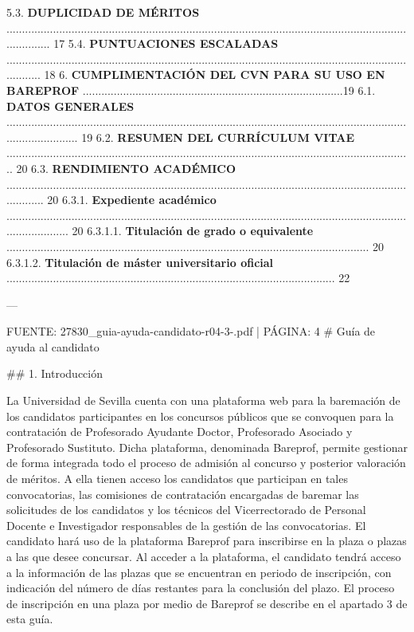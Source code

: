 \documentclass{article}
\begin{document}
\begin{itemize}
\begin{itemize}
\begin{scriptsize}
                  5.3. \textbf{DUPLICIDAD DE MÉRITOS} ............................................................................................................................................... 17
                  5.4. \textbf{PUNTUACIONES ESCALADAS} ............................................................................................................................................ 18
                  6. \textbf{CUMPLIMENTACIÓN DEL CVN PARA SU USO EN BAREPROF} ....................................................................................19
                  6.1. \textbf{DATOS GENERALES} ........................................................................................................................................................ 19
                  6.2. \textbf{RESUMEN DEL CURRÍCULUM VITAE} ................................................................................................................................... 20
                  6.3. \textbf{RENDIMIENTO ACADÉMICO} ............................................................................................................................................. 20
                  6.3.1. \textbf{Expediente académico} ..................................................................................................................................................... 20
                  6.3.1.1. \textbf{Titulación de grado o equivalente} ..................................................................................................................... 20
                  6.3.1.2. \textbf{Titulación de máster universitario oficial} .......................................................................................................... 22

                  ---

                  FUENTE: 27830\_guia-ayuda-candidato-r04-3-.pdf | PÁGINA: 4
                  \# Guía de ayuda al candidato

                  \#\# 1. Introducción

                  La Universidad de Sevilla cuenta con una plataforma web para la baremación de los candidatos participantes en los concursos públicos que se convoquen para la contratación de Profesorado Ayudante Doctor, Profesorado Asociado y Profesorado Sustituto. Dicha plataforma, denominada Bareprof, permite gestionar de forma integrada todo el proceso de admisión al concurso y posterior valoración de méritos. A ella tienen acceso los candidatos que participan en tales convocatorias, las comisiones de contratación encargadas de baremar las solicitudes de los candidatos y los técnicos del Vicerrectorado de Personal Docente e Investigador responsables de la gestión de las convocatorias. El candidato hará uso de la plataforma Bareprof para inscribirse en la plaza o plazas a las que desee concursar. Al acceder a la plataforma, el candidato tendrá acceso a la información de las plazas que se encuentran en periodo de inscripción, con indicación del número de días restantes para la conclusión del plazo. El proceso de inscripción en una plaza por medio de Bareprof se describe en el apartado 3 de esta guía.


\end{scriptsize}
\end{itemize}
\end{itemize}
\end{document}
